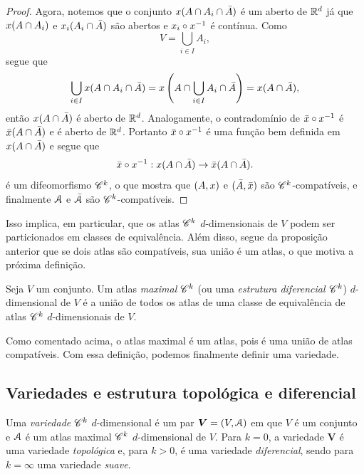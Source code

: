\begin{proof}
Agora, notemos que o conjunto $x(A \cap A_i \cap \bar A)$ é um aberto de $\mathbb{R}^d$ já que $x(A \cap A_i)$ e $x_i(A_i \cap \bar A)$ são abertos e $x_i \circ x^{-1}$ é contínua. Como
	\begin{equation*}
	V= \bigcup_{i \in I} A_i,
	\end{equation*}
segue que
	\begin{equation*}
	\bigcup_{i \in I} x(A \cap A_i \cap \bar A) = x\left(A \cap \bigcup_{i \in I} A_i \cap \bar A\right) = x(A \cap \bar A),
	\end{equation*}
então $x(A \cap \bar A)$ é aberto de $\mathbb{R}^d$. Analogamente, o contradomínio de $\bar{x} \circ x^{-1}$ é $\bar{x}(A \cap \bar A)$ e é aberto de $\mathbb{R}^d$. Portanto $\bar{x} \circ x^{-1}$ é uma função bem definida em $x(A \cap \bar A)$ e segue que
	\begin{equation*}
	\bar{x} \circ x^{-1}: x(A \cap \bar A) \to \bar{x}(A \cap \bar A).
	\end{equation*}
é um difeomorfismo $\mathscr{C}^k$, o que mostra que $(A,x)$ e $(\bar A,\bar{x})$ são $\mathscr{C}^k$-compatíveis, e finalmente $\mathcal{A}$ e $\bar{\mathcal{A}}$ são $\mathscr{C}^k$-compatíveis.
\end{proof}

Isso implica, em particular, que os atlas $\mathscr{C}^k$ $d$-dimensionais de $V$ podem ser particionados em classes de equivalência. Além disso, segue da proposição anterior que se dois atlas são compatíveis, sua união é um atlas, o que motiva a próxima definição.

\begin{definition}
Seja $V$ um conjunto. Um atlas \emph{maximal} $\mathscr{C}^k$ (ou uma \emph{estrutura diferencial $\mathscr{C}^k$}) $d$-dimensional de $V$ é a união de todos os atlas de uma classe de equivalência de atlas $\mathscr{C}^k$ $d$-dimensionais de $V$.
\end{definition}

Como comentado acima, o atlas maximal é um atlas, pois é uma união de atlas compatíveis. Com essa definição, podemos finalmente definir uma variedade.

\subsection{Variedades e estrutura topológica e diferencial}

\begin{definition}
Uma \emph{variedade} $\mathscr{C}^k$ $d$-dimensional é um par $\bm V=(V,\mathcal{A})$ em que $V$ é um conjunto e $\mathcal{A}$ é um atlas maximal $\mathscr{C}^k$ $d$-dimensional de $V$. Para $k=0$, a variedade $\bm V$ é uma variedade \emph{topológica} e, para $k>0$, é uma variedade \emph{diferencial}, sendo para $k=\infty$ uma variedade \emph{suave}.
\end{definition}

